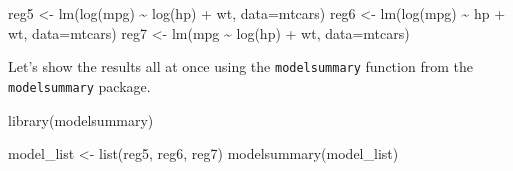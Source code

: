 \documentclass[
  letterpaper,
  DIV=11,
  numbers=noendperiod]{scrreprt}
\newenvironment{Shaded}{\begin{snugshade}}{\end{snugshade}}
\newcommand{\AttributeTok}[1]{\textcolor[rgb]{0.40,0.45,0.13}{#1}}
\newcommand{\FunctionTok}[1]{\textcolor[rgb]{0.28,0.35,0.67}{#1}}
\newcommand{\NormalTok}[1]{\textcolor[rgb]{0.00,0.23,0.31}{#1}}
\newcommand{\OtherTok}[1]{\textcolor[rgb]{0.00,0.23,0.31}{#1}}
\newcommand{\SpecialCharTok}[1]{\textcolor[rgb]{0.37,0.37,0.37}{#1}}
\begin{document}
\begin{Shaded}
\begin{Highlighting}[]
\NormalTok{reg5 }\OtherTok{\textless{}{-}} \FunctionTok{lm}\NormalTok{(}\FunctionTok{log}\NormalTok{(mpg) }\SpecialCharTok{\textasciitilde{}} \FunctionTok{log}\NormalTok{(hp) }\SpecialCharTok{+}\NormalTok{ wt, }\AttributeTok{data=}\NormalTok{mtcars) }
\NormalTok{reg6 }\OtherTok{\textless{}{-}} \FunctionTok{lm}\NormalTok{(}\FunctionTok{log}\NormalTok{(mpg) }\SpecialCharTok{\textasciitilde{}}\NormalTok{ hp }\SpecialCharTok{+}\NormalTok{ wt, }\AttributeTok{data=}\NormalTok{mtcars) }
\NormalTok{reg7 }\OtherTok{\textless{}{-}} \FunctionTok{lm}\NormalTok{(mpg }\SpecialCharTok{\textasciitilde{}} \FunctionTok{log}\NormalTok{(hp) }\SpecialCharTok{+}\NormalTok{ wt, }\AttributeTok{data=}\NormalTok{mtcars)}
\end{Highlighting}
\end{Shaded}

Let's show the results all at once using the \texttt{modelsummary}
function from the \texttt{modelsummary} package.

\begin{Shaded}
\begin{Highlighting}[]
\FunctionTok{library}\NormalTok{(modelsummary)}

\NormalTok{model\_list }\OtherTok{\textless{}{-}} \FunctionTok{list}\NormalTok{(reg5, reg6, reg7)}
\FunctionTok{modelsummary}\NormalTok{(model\_list)}
\end{Highlighting}
\end{Shaded}
\end{document}
